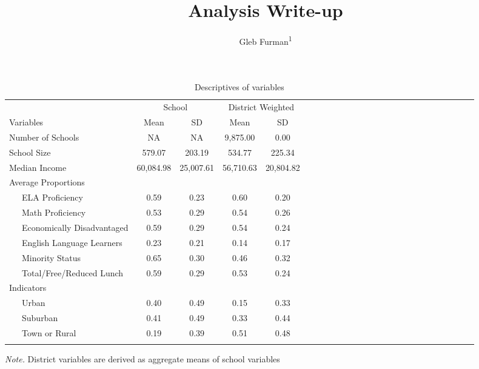 \documentclass[floatsintext,man]{apa6}
\title{Analysis Write-up}
\author{Gleb Furman\textsuperscript{1}}
\affiliation{
    \vspace{0.5cm}
          \textsuperscript{1} Who Kneads a PH.D. Bakery  }
\theoremstyle{definition}
\theoremstyle{definition}
\theoremstyle{definition}
\theoremstyle{remark}
\begin{document}
\maketitle

\setcounter{secnumdepth}{0}



\begin{table}[tbp]
\begin{center}
\begin{threeparttable}
\caption{\label{tab:tbl-desc}Descriptives of variables}
\begin{tabular}{lcccclcccclcccclcccclcccc}
\toprule
 & \multicolumn{2}{c}{School} & \multicolumn{2}{c}{District Weighted} \\
\cmidrule(r){2-3} \cmidrule(r){4-5}
Variables & Mean & SD & Mean & SD\\
\midrule
Number of Schools & NA & NA & 9,875.00 & 0.00\\
School Size & 579.07 & 203.19 & 534.77 & 225.34\\
Median Income & 60,084.98 & 25,007.61 & 56,710.63 & 20,804.82\\
Average Proportions &  &  &  & \\
\ \ \ ELA Proficiency & 0.59 & 0.23 & 0.60 & 0.20\\
\ \ \ Math Proficiency & 0.53 & 0.29 & 0.54 & 0.26\\
\ \ \ Economically Disadvantaged & 0.59 & 0.29 & 0.54 & 0.24\\
\ \ \ English Language Learners & 0.23 & 0.21 & 0.14 & 0.17\\
\ \ \ Minority Status & 0.65 & 0.30 & 0.46 & 0.32\\
\ \ \ Total/Free/Reduced Lunch & 0.59 & 0.29 & 0.53 & 0.24\\
Indicators &  &  &  & \\
\ \ \ Urban & 0.40 & 0.49 & 0.15 & 0.33\\
\ \ \ Suburban & 0.41 & 0.49 & 0.33 & 0.44\\
\ \ \ Town or Rural & 0.19 & 0.39 & 0.51 & 0.48\\
\bottomrule
\addlinespace
\end{tabular}
\begin{tablenotes}[para]
\textit{Note.} District variables are derived as aggregate means of school variables
\end{tablenotes}
\end{threeparttable}
\end{center}
\end{table}
\end{document}
